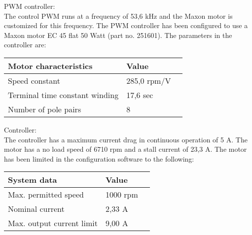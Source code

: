 PWM controller:\\
The control PWM runs at a frequency of 53,6 kHz and the Maxon motor is customized for this frequency.
The PWM controller has been configured to use a Maxon motor EC 45 flat 50 Watt (part no. 251601). The parameters in the controller are:
\begin{table}[H]
	\begin{tabular}{|l|l|p{4.3cm}|}
		\hline%
		\textbf{Motor characteristics}       &  \textbf{Value}         \\
		\hline%
		Speed constant                                & 285,0 rpm/V           \\
		\hline%
		Terminal time constant winding							  & 17,6 sec              \\
		\hline%
		Number of pole pairs							  & 8              \\
		\hline%
	\end{tabular}
\end{table}

Controller:\\
The controller has a maximum current drag in continuous operation of 5 A.
The motor has a no load speed of 6710 rpm and a stall current of 23,3 A.
The motor has been limited in the configuration software to the following:
\begin{table}[H]
	\begin{tabular}{|l|l|p{4.3cm}|}
		\hline%
		\textbf{System data}       &  \textbf{Value}         \\
		\hline%
		Max. permitted speed                                & 1000 rpm           \\
		\hline%
		Nominal current							  & 2,33 A              \\
		\hline%
		Max. output current limit							  & 9,00 A              \\
		\hline%
	\end{tabular}
\end{table}

